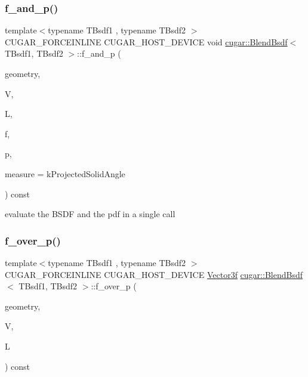 \subsubsection{\texorpdfstring{f\+\_\+and\+\_\+p()}{f\_and\_p()}}
{\footnotesize\ttfamily template$<$typename T\+Bsdf1 , typename T\+Bsdf2 $>$ \\
C\+U\+G\+A\+R\+\_\+\+F\+O\+R\+C\+E\+I\+N\+L\+I\+NE C\+U\+G\+A\+R\+\_\+\+H\+O\+S\+T\+\_\+\+D\+E\+V\+I\+CE void \hyperlink{structcugar_1_1_blend_bsdf}{cugar\+::\+Blend\+Bsdf}$<$ T\+Bsdf1, T\+Bsdf2 $>$\+::f\+\_\+and\+\_\+p (\begin{DoxyParamCaption}\item[{const \hyperlink{structcugar_1_1_differential_geometry}{Differential\+Geometry} \&}]{geometry,  }\item[{const \hyperlink{structcugar_1_1_vector}{Vector3f}}]{V,  }\item[{const \hyperlink{structcugar_1_1_vector}{Vector3f}}]{L,  }\item[{\hyperlink{structcugar_1_1_vector}{Vector3f} \&}]{f,  }\item[{float \&}]{p,  }\item[{const Spherical\+Measure}]{measure = {\ttfamily kProjectedSolidAngle} }\end{DoxyParamCaption}) const\hspace{0.3cm}{\ttfamily [inline]}}

evaluate the B\+S\+DF and the pdf in a single call \mbox{\label{structcugar_1_1_blend_bsdf_a7d5ba65e5d6de1e48ffdf523f31e6cd6}} 
\subsubsection{\texorpdfstring{f\+\_\+over\+\_\+p()}{f\_over\_p()}}
{\footnotesize\ttfamily template$<$typename T\+Bsdf1 , typename T\+Bsdf2 $>$ \\
C\+U\+G\+A\+R\+\_\+\+F\+O\+R\+C\+E\+I\+N\+L\+I\+NE C\+U\+G\+A\+R\+\_\+\+H\+O\+S\+T\+\_\+\+D\+E\+V\+I\+CE \hyperlink{structcugar_1_1_vector}{Vector3f} \hyperlink{structcugar_1_1_blend_bsdf}{cugar\+::\+Blend\+Bsdf}$<$ T\+Bsdf1, T\+Bsdf2 $>$\+::f\+\_\+over\+\_\+p (\begin{DoxyParamCaption}\item[{const \hyperlink{structcugar_1_1_differential_geometry}{Differential\+Geometry} \&}]{geometry,  }\item[{const \hyperlink{structcugar_1_1_vector}{Vector3f}}]{V,  }\item[{const \hyperlink{structcugar_1_1_vector}{Vector3f}}]{L }\end{DoxyParamCaption}) const\hspace{0.3cm}{\ttfamily [inline]}}

